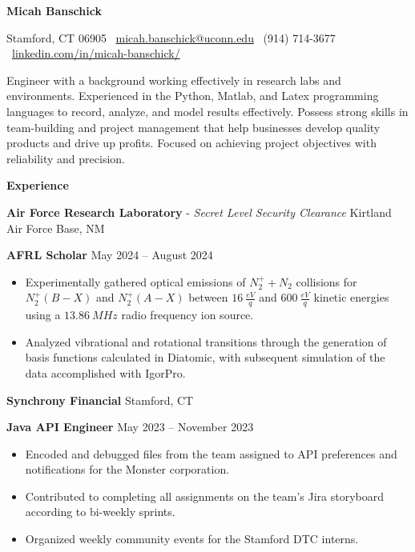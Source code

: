 \documentclass[11pt]{article}
\begin{document}
\begin{center}
    \textbf{Micah Banschick}\\ 
    \hrulefill
\end{center}

\begin{center}
    Stamford, CT 06905 \textbullet \ \href{mailto:micah.banschick@uconn.edu}{micah.banschick@uconn.edu} \textbullet \ (914) 714-3677 \textbullet \ \href{https://www.linkedin.com/in/micah-banschick/}{linkedin.com/in/micah-banschick/}
\end{center}

\vspace{0.5pt}

\begin{center}
    Engineer with a background working effectively in research labs and environments. Experienced in the Python, Matlab, and Latex programming languages to record, analyze, and model results effectively. Possess strong skills in team-building and project management that help businesses develop quality products and drive up profits. Focused on achieving project objectives with reliability and precision.
\end{center}

\begin{center}
    \textbf{Experience}
\end{center}
\textbf{Air Force Research Laboratory} - \textit{Secret Level Security Clearance} \hfill Kirtland Air Force Base, NM

\textbf{AFRL Scholar} \hfill May 2024 – August 2024
\begin{itemize}[noitemsep, topsep=0pt, partopsep=0pt, parsep=0pt]
    \item Experimentally gathered optical emissions of $N^+_2 + N_2$ collisions for $N^+_2(B-X)$ and $N^+_2(A-X)$ between $16\ \frac{eV}{q}$ and $600\ \frac{eV}{q}$ kinetic energies using a $13.86\ MHz$ radio frequency ion source.
    \item Analyzed vibrational and rotational transitions through the generation of basis functions calculated in Diatomic, with subsequent simulation of the data accomplished with IgorPro.
\end{itemize}

\vspace{12pt}

\textbf{Synchrony Financial} \hfill Stamford, CT

\textbf{Java API Engineer} \hfill May 2023 – November 2023
\begin{itemize}[noitemsep, topsep=0pt, partopsep=0pt, parsep=0pt]
    \item Encoded and debugged files from the team assigned to API preferences and notifications for the Monster corporation.
    \item Contributed to completing all assignments on the team’s Jira storyboard according to bi-weekly sprints.
    \item Organized weekly community events for the Stamford DTC interns.
\end{itemize}
\end{document}

